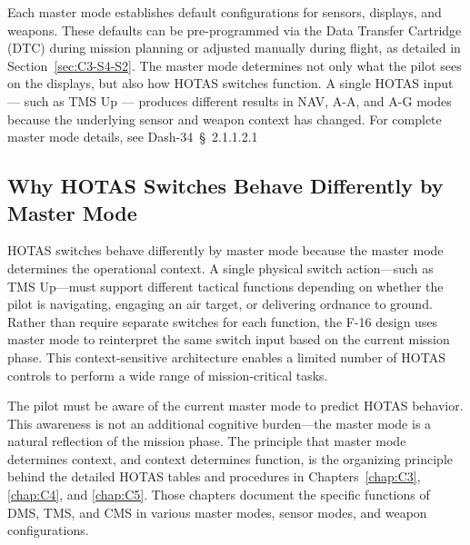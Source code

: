 \documentclass[11pt, a4paper, twoside]{report}
\providecommand{\dashref}[1]{Dash-34~\S~#1}
\begin{document}
Each master mode establishes default configurations for sensors, displays, and weapons. These defaults can be pre-programmed via the Data Transfer Cartridge (DTC) during mission planning or adjusted manually during flight, as detailed in Section~\ref{sec:C3-S4-S2}. The master mode determines not only what the pilot sees on the displays, but also how HOTAS switches function. A single HOTAS input — such as TMS Up — produces different results in NAV, A-A, and A-G modes because the underlying sensor and weapon context has changed. For complete master mode details, see \dashref{2.1.1.2.1}


\subsection{Why HOTAS Switches Behave Differently by Master Mode}
\label{sec:C2-S2-S2}

HOTAS switches behave differently by master mode because the master mode determines the operational context. A single physical switch action—such as TMS Up—must support different tactical functions depending on whether the pilot is navigating, engaging an air target, or delivering ordnance to ground. Rather than require separate switches for each function, the F-16 design uses master mode to reinterpret the same switch input based on the current mission phase. This context-sensitive architecture enables a limited number of HOTAS controls to perform a wide range of mission-critical tasks.

The pilot must be aware of the current master mode to predict HOTAS behavior. This awareness is not an additional cognitive burden—the master mode is a natural reflection of the mission phase. The principle that master mode determines context, and context determines function, is the organizing principle behind the detailed HOTAS tables and procedures in Chapters~\ref{chap:C3}, \ref{chap:C4}, and \ref{chap:C5}. Those chapters document the specific functions of DMS, TMS, and CMS in various master modes, sensor modes, and weapon configurations.

\end{document}
